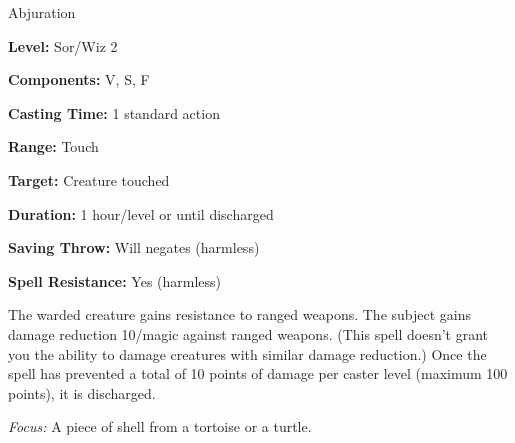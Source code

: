 
Abjuration

\textbf{Level:} Sor/Wiz 2

\textbf{Components:} V, S, F

\textbf{Casting Time:} 1 standard action

\textbf{Range:} Touch

\textbf{Target:} Creature touched

\textbf{Duration:} 1 hour/level or until discharged

\textbf{Saving Throw:} Will negates (harmless)

\textbf{Spell Resistance:} Yes (harmless)

The warded creature gains resistance to ranged weapons. The subject gains damage 
reduction 10/magic against ranged weapons. (This spell doesn't grant you the ability 
to damage creatures with similar damage reduction.) Once the spell has prevented 
a total of 10 points of damage per caster level (maximum 100 points), it is discharged.

\textit{Focus:} A piece of shell from a tortoise or a turtle.

